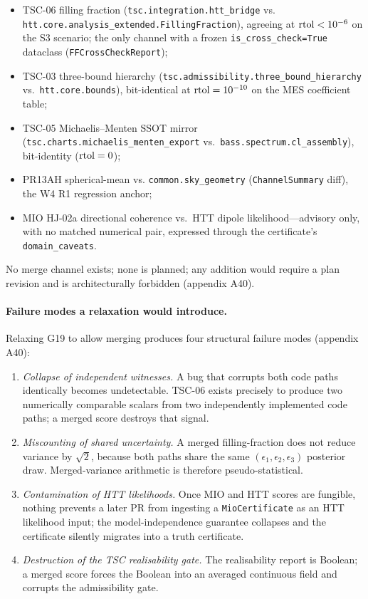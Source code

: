 \begin{itemize}
\item TSC-06 filling fraction
  (\texttt{tsc.integration.htt\_bridge} vs.
  \texttt{htt.core.analysis\_extended.FillingFraction}),
  agreeing at ${\rm rtol} < 10^{-6}$ on the S3 scenario;
  the only channel with a frozen
  \texttt{is\_cross\_check=True} dataclass
  (\texttt{FFCrossCheckReport});
\item TSC-03 three-bound hierarchy
  (\texttt{tsc.admissibility.three\_bound\_hierarchy}
  vs.\ \texttt{htt.core.bounds}), bit-identical at
  ${\rm rtol}=10^{-10}$ on the MES coefficient table;
\item TSC-05 Michaelis--Menten SSOT mirror
  (\texttt{tsc.charts.michaelis\_menten\_export} vs.\
  \texttt{bass.spectrum.cl\_assembly}), bit-identity
  (${\rm rtol}=0$);
\item PR13AH spherical-mean vs.
  \texttt{common.sky\_geometry} (\texttt{ChannelSummary}
  diff), the W4 R1 regression anchor;
\item MIO HJ-02a directional coherence vs.\ HTT dipole
  likelihood---advisory only, with no matched numerical
  pair, expressed through the certificate's
  \texttt{domain\_caveats}.
\end{itemize}

No merge channel exists; none is planned; any addition
would require a plan revision and is architecturally
forbidden (appendix A40).


\paragraph{Failure modes a relaxation would introduce.}

Relaxing G19 to allow merging produces four structural
failure modes (appendix A40):

\begin{enumerate}
\item \emph{Collapse of independent witnesses.}  A bug that
  corrupts both code paths identically becomes undetectable.
  TSC-06 exists precisely to produce two numerically
  comparable scalars from two independently implemented code
  paths; a merged score destroys that signal.
\item \emph{Miscounting of shared uncertainty.}  A merged
  filling-fraction does not reduce variance by $\sqrt 2$,
  because both paths share the same $(\epsilon_1,
  \epsilon_2, \epsilon_3)$ posterior draw.  Merged-variance
  arithmetic is therefore pseudo-statistical.
\item \emph{Contamination of HTT likelihoods.}  Once MIO and
  HTT scores are fungible, nothing prevents a later PR from
  ingesting a \texttt{MioCertificate} as an HTT likelihood
  input; the model-independence guarantee collapses and the
  certificate silently migrates into a truth certificate.
\item \emph{Destruction of the TSC realisability gate.}
  The realisability report is Boolean; a merged score forces
  the Boolean into an averaged continuous field and corrupts
  the admissibility gate.
\end{enumerate}

